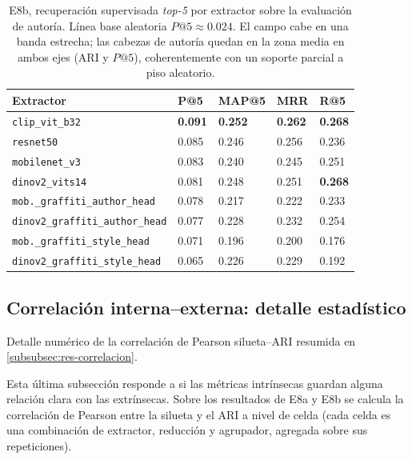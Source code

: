 \begin{table}[h]
\caption[E8b, recuperación supervisada \textit{top-5} (autoría)]{E8b, recuperación supervisada \textit{top-5} por extractor sobre
la evaluación de autoría. Línea base aleatoria $P@5 \approx 0.024$. El
campo cabe en una banda estrecha; las cabezas de autoría quedan en la
zona media en ambos ejes (ARI y $P@5$), coherentemente con un soporte
parcial a piso aleatorio.}
\label{tab:e8b-retrieval}
\centering
{\footnotesize
\begin{tabular}{|p{5.4cm}|p{1.2cm}|p{1.6cm}|p{1.2cm}|p{1.2cm}|} \hline
  \textbf{Extractor} & \textbf{P@5} & \textbf{MAP@5} & \textbf{MRR} & \textbf{R@5} \\ \hline
  \texttt{clip\_vit\_b32}                    & \textbf{0.091} & \textbf{0.252} & \textbf{0.262} & \textbf{0.268} \\ \hline
  \texttt{resnet50}                          & 0.085 & 0.246 & 0.256 & 0.236 \\ \hline
  \texttt{mobilenet\_v3}                     & 0.083 & 0.240 & 0.245 & 0.251 \\ \hline
  \texttt{dinov2\_vits14}                    & 0.081 & 0.248 & 0.251 & \textbf{0.268} \\ \hline
  \texttt{mob.\_graffiti\_author\_head}      & 0.078 & 0.217 & 0.222 & 0.233 \\ \hline
  \texttt{dinov2\_graffiti\_author\_head}    & 0.077 & 0.228 & 0.232 & 0.254 \\ \hline
  \texttt{mob.\_graffiti\_style\_head}       & 0.071 & 0.196 & 0.200 & 0.176 \\ \hline
  \texttt{dinov2\_graffiti\_style\_head}     & 0.065 & 0.226 & 0.229 & 0.192 \\ \hline
\end{tabular}
}
\end{table}

\subsection{Correlación interna--externa: detalle estadístico}
\label{anexo:correlacion}
Detalle numérico de la correlación de Pearson silueta--ARI resumida en
\ref{subsubsec:res-correlacion}.

Esta última subsección responde a si las métricas intrínsecas guardan alguna
relación clara con las extrínsecas. Sobre los resultados de E8a y E8b se calcula
la correlación de Pearson entre la silueta y el ARI a nivel de celda (cada celda
es una combinación de extractor, reducción y agrupador, agregada sobre sus
repeticiones).

